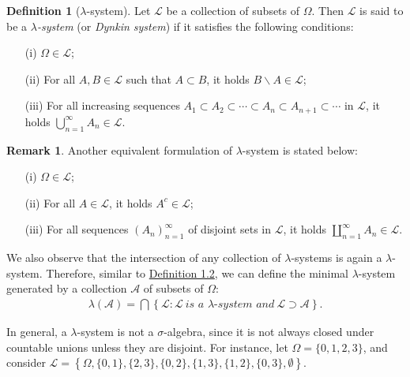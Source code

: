 \documentclass{article}
\numberwithin{equation}{section}
\theoremstyle{plain}
\theoremstyle{definition}
\newtheorem{definition}[theorem]{Definition}
\newtheorem*{remark}{Remark}
\begin{document}
\begin{definition}[$\lambda$-system] Let $\mathscr{L}$ be a collection of subsets of $\Omega$. Then $\mathscr{L}$ is said to be a \textit{$\lambda$-system} (or \textit{Dynkin system}) if it satisfies the following conditions:
\begin{itemize}
	\item[(i)] $\Omega\in\mathscr{L}$;
	\item[(ii)] For all $A,B\in\mathscr{L}$ such that $A\subset B$, it holds $B\backslash A\in \mathscr{L}$;
	\item[(iii)] For all increasing sequences $A_1\subset A_2\subset\cdots\subset A_n\subset A_{n+1}\subset\cdots$ in $\mathscr{L}$, it holds $\bigcup_{n=1}^\infty A_n\in\mathscr{L}$.
\end{itemize}
\end{definition}
\begin{remark} Another equivalent formulation of $\lambda$-system is stated below:
\begin{itemize}
	\item[(i)] $\Omega\in\mathscr{L}$;
	\item[(ii)] For all $A\in\mathscr{L}$, it holds $A^c\in \mathscr{L}$;
	\item[(iii)] For all sequences $(A_n)_{n=1}^\infty$ of disjoint sets in $\mathscr{L}$, it holds $\coprod_{n=1}^\infty A_n\in\mathscr{L}$.
\end{itemize}
We also observe that the intersection of any collection of $\lambda$-systems is again a $\lambda$-system. Therefore, similar to \hyperref[def:1.2]{Definition 1.2}, we can define the minimal $\lambda$-system generated by a collection $\mathscr{A}$ of subsets of $\Omega$:
\begin{align*}
	\lambda(\mathscr{A})=\bigcap\left\{\mathscr{L}:\mathscr{L}\ \textit{is a $\lambda$-system and}\ \mathscr{L}\supset \mathscr{A}\right\}.
\end{align*}
\end{remark}

In general, a $\lambda$-system is not a $\sigma$-algebra, since it is not always closed under countable unions unless they are disjoint. For instance, let $\Omega=\{0,1,2,3\}$, and consider $\mathscr{L}=\left\{\Omega,\{0,1\},\{2,3\},\{0,2\},\{1,3\},\{1,2\},\{0,3\},\emptyset\right\}$.
\end{document}
